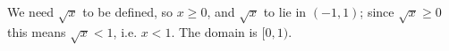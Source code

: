 We need $\sqrt x$ to be defined, so $x\ge0$, and $\sqrt x$ to lie in $(-1,1)$; since $\sqrt x\ge0$ this means $\sqrt x<1$, i.e. $x<1$. The domain is $\boxed{[0,1)}$.
